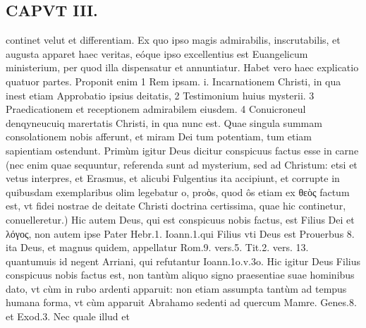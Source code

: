 \documentclass{article}
\begin{document}
\begin{pages}
\section*{CAPVT  III. }
\marginpar{[ p.2 ]}\pstart continet velut et differentiam. Ex quo ipso magis admirabilis, inscrutabilis, et augusta apparet haec veritas, eóque  ipso excellentius est Euangelicum ministerium, per quod illa dispensatur et annuntiatur. Habet vero haec explicatio quatuor partes. Proponit enim 1 Rem ipsam. i. Incarnationem Christi, in qua inest etiam Approbatio ipsius deitatis, 2 Testimonium huius mysterii. 3 Praedicationem et receptionem admirabilem eiusdem. 4 Conuicroneul denqyneucuiq marertatis Christi, in qua nunc est. Quae singula summam consolationem nobis afferunt, et miram Dei tum potentiam, tum etiam sapientiam ostendunt.  \pend\pstart Primùm igitur Deus dicitur conspicuus factus esse in carne (nec enim quae sequuntur, referenda sunt ad mysterium, sed ad Christum: etsi et vetus interpres, et Erasmus, et alicubi Fulgentius ita accipiunt, et corrupte in quibusdam exemplaribus olim legebatur o, proὸs, quod ôs etiam ex θεὸς factum est, vt fidei nostrae de deitate Christi doctrina certissima, quae hic continetur, conuelleretur.) Hic autem Deus, qui est conspicuus nobis factus, est Filius Dei et λόγος, non autem ipse Pater Hebr.1. Ioann.1.qui Filius vti Deus est Prouerbus 8. ita Deus, et magnus quidem, appellatur Rom.9. vers.5. Tit.2. vers. 13. quantumuis id negent Arriani, qui refutantur Ioann.1o.v.3o. Hic igitur Deus Filius conspicuus nobis factus est, non tantùm aliquo signo praesentiae suae hominibus dato, vt cùm in rubo ardenti apparuit: non etiam assumpta tantùm ad tempus humana forma, vt cùm apparuit Abrahamo sedenti ad quercum Mamre. Genes.8. et Exod.3. Nec quale illud et  \pend

\end{pages}
\end{document}
